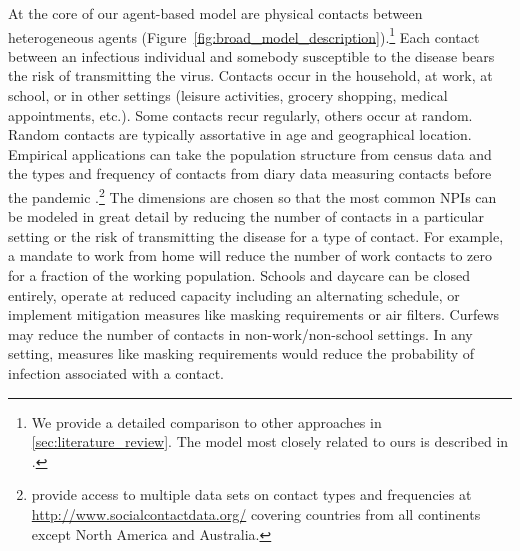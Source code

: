 At the core of our agent-based model are physical contacts between heterogeneous agents (Figure~\ref{fig:broad_model_description}).\footnote{We provide a detailed comparison to other approaches in \ref{sec:literature_review}. The model most closely related to ours is described in \citet{Hinch2020}.} Each contact between an infectious individual and somebody susceptible to the disease bears the risk of transmitting the virus. Contacts occur in the household, at work, at school, or in other settings (leisure activities, grocery shopping, medical appointments, etc.). Some contacts recur regularly, others occur at random. Random contacts are typically assortative in age and geographical location. Empirical applications can take the population structure from census data and the types and frequency of contacts from diary data measuring contacts before the pandemic \citep[e.g.][]{Mossong2008}.\footnote{\citet{Hoang2019} provide access to multiple data sets on contact types and frequencies at \url{http://www.socialcontactdata.org/} covering countries from all continents except North America and Australia.} The dimensions are chosen so that the most common NPIs can be modeled in great detail by reducing the number of contacts in a particular setting or the risk of transmitting the disease for a type of contact. For example, a mandate to work from home will reduce the number of work contacts to zero for a fraction of the working population. Schools and daycare can be closed entirely, operate at reduced capacity including an alternating schedule, or implement mitigation measures like masking requirements or air filters. Curfews may reduce the number of contacts in non-work/non-school settings. In any setting, measures like masking requirements would reduce the probability of infection associated with a contact.

